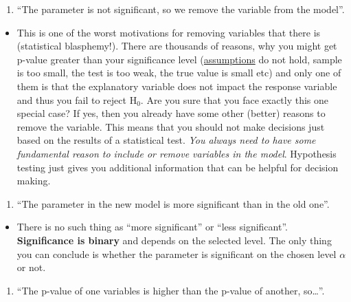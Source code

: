 \documentclass[
]{book}
\providecommand{\tightlist}{%
  \setlength{\itemsep}{0pt}\setlength{\parskip}{0pt}}
\theoremstyle{definition}
\theoremstyle{definition}
\theoremstyle{definition}
\theoremstyle{definition}
\theoremstyle{remark}
\begin{document}
\begin{enumerate}
\def\labelenumi{\arabic{enumi}.}
\setcounter{enumi}{5}
\tightlist
\item
  ``The parameter is not significant, so we remove the variable from the model''.
\end{enumerate}

\begin{itemize}
\tightlist
\item
  This is one of the worst motivations for removing variables that there is (statistical blasphemy!). There are thousands of reasons, why you might get p-value greater than your significance level (\protect\hyperlink{assumptions}{assumptions} do not hold, sample is too small, the test is too weak, the true value is small etc) and only one of them is that the explanatory variable does not impact the response variable and thus you fail to reject \(\mathrm{H}_0\). Are you sure that you face exactly this one special case? If yes, then you already have some other (better) reasons to remove the variable. This means that you should not make decisions just based on the results of a statistical test. \emph{You always need to have some fundamental reason to include or remove variables in the model}. Hypothesis testing just gives you additional information that can be helpful for decision making.
\end{itemize}

\begin{enumerate}
\def\labelenumi{\arabic{enumi}.}
\setcounter{enumi}{6}
\tightlist
\item
  ``The parameter in the new model is more significant than in the old one''.
\end{enumerate}

\begin{itemize}
\tightlist
\item
  There is no such thing as ``more significant'' or ``less significant''. \textbf{Significance is binary} and depends on the selected level. The only thing you can conclude is whether the parameter is significant on the chosen level \(\alpha\) or not.
\end{itemize}

\begin{enumerate}
\def\labelenumi{\arabic{enumi}.}
\setcounter{enumi}{7}
\tightlist
\item
  ``The p-value of one variables is higher than the p-value of another, so\ldots{}''.
\end{enumerate}
\end{document}
